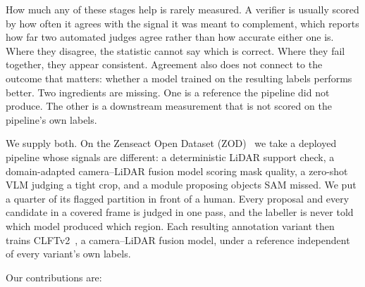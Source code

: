 \documentclass[journal]{IEEEtran}
\begin{document}
How much any of these stages help is rarely measured.
A verifier is usually scored by how often it agrees with the signal it was meant to complement, which reports how far two automated judges agree rather than how accurate either one is.
Where they disagree, the statistic cannot say which is correct.
Where they fail together, they appear consistent.
Agreement also does not connect to the outcome that matters: whether a model trained on the resulting labels performs better.
Two ingredients are missing.
One is a reference the pipeline did not produce.
The other is a downstream measurement that is not scored on the pipeline’s own labels.

We supply both.
On the Zenseact Open Dataset (ZOD)~\cite{alibeigi2023zod} we take a deployed pipeline whose signals are different: a deterministic LiDAR support check, a domain-adapted camera--LiDAR fusion model scoring mask quality, a zero-shot VLM judging a tight crop, and a module proposing objects SAM missed.
We put a quarter of its flagged partition in front of a human.
Every proposal and every candidate in a covered frame is judged in one pass, and the labeller is never told which model produced which region.
Each resulting annotation variant then trains CLFTv2~\cite{gu2024clft}, a camera--LiDAR fusion model, under a reference independent of every variant’s own labels.

Our contributions are:
\end{document}
